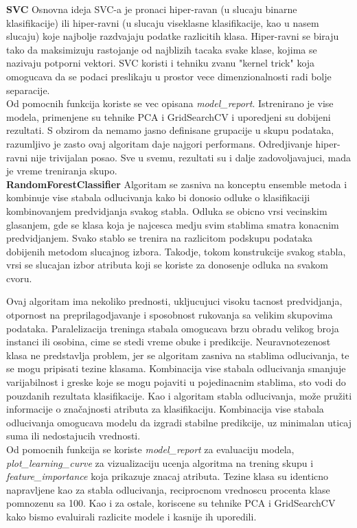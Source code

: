 \documentclass[10pt]{article}
\begin{document}
\textbf{SVC}
 Osnovna ideja SVC-a je pronaci hiper-ravan (u slucaju binarne klasifikacije) ili hiper-ravni (u slucaju viseklasne klasifikacije, kao u nasem slucaju) koje najbolje razdvajaju podatke razlicitih klasa. Hiper-ravni se biraju tako da maksimizuju rastojanje od najblizih tacaka svake klase, kojima se nazivaju potporni vektori. SVC koristi i tehniku zvanu "kernel trick" koja omogucava da se podaci preslikaju u prostor vece dimenzionalnosti radi bolje separacije.
\\

Od pomocnih funkcija koriste se vec opisana \textit{model\_report}. Istrenirano je vise modela, primenjene su tehnike PCA i GridSearchCV i uporedjeni su dobijeni rezultati. S obzirom da nemamo jasno definisane grupacije u skupu podataka, razumljivo je zasto ovaj algoritam daje najgori performans. Odredjivanje hiper-ravni nije trivijalan posao. Sve u svemu, rezultati su i dalje zadovoljavajuci, mada je vreme treniranja skupo. \\

\textbf{RandomForestClassifier}
Algoritam se zasniva na konceptu ensemble metoda i kombinuje vise stabala odlucivanja kako bi donosio odluke o klasifikaciji kombinovanjem predvidjanja svakog stabla. Odluka se obicno vrsi vecinskim glasanjem, gde se klasa koja je najcesca medju svim stablima smatra konacnim predvidjanjem. Svako stablo se trenira na razlicitom podskupu podataka dobijenih metodom slucajnog izbora. Takodje, tokom konstrukcije svakog stabla, vrsi se slucajan izbor atributa koji se koriste za donosenje odluka na svakom cvoru.

Ovaj algoritam ima nekoliko prednosti, ukljucujuci visoku tacnost predvidjanja, otpornost na preprilagodjavanje i sposobnost rukovanja sa velikim skupovima podataka. Paralelizacija treninga stabala omogucava brzu obradu velikog broja instanci ili osobina, cime se stedi vreme obuke i predikcije. Neuravnotezenost klasa ne predstavlja problem, jer se algoritam zasniva na stablima odlucivanja, te se mogu pripisati tezine klasama. Kombinacija vise stabala odlucivanja smanjuje varijabilnost i greske koje se mogu pojaviti u pojedinacnim stablima, sto vodi do pouzdanih rezultata klasifikacije. Kao i algoritam stabla odlucivanja, može pružiti informacije o značajnosti atributa za klasifikaciju. Kombinacija vise stabala odlucivanja omogucava modelu da izgradi stabilne predikcije, uz minimalan uticaj suma ili nedostajucih vrednosti.\\

Od pomocnih funkcija se koriste \textit{model\_report} za evaluaciju modela,\\ \textit{plot\_learning\_curve} za vizualizaciju ucenja algoritma na trening skupu i \textit{feature\_importance} koja prikazuje znacaj atributa. Tezine klasa su identicno napravljene kao za stabla odlucivanja, reciprocnom vrednoscu procenta klase pomnozenu sa 100. Kao i za ostale, koriscene su tehnike PCA i GridSearchCV kako bismo evaluirali razlicite modele i kasnije ih uporedili.
\end{document}
